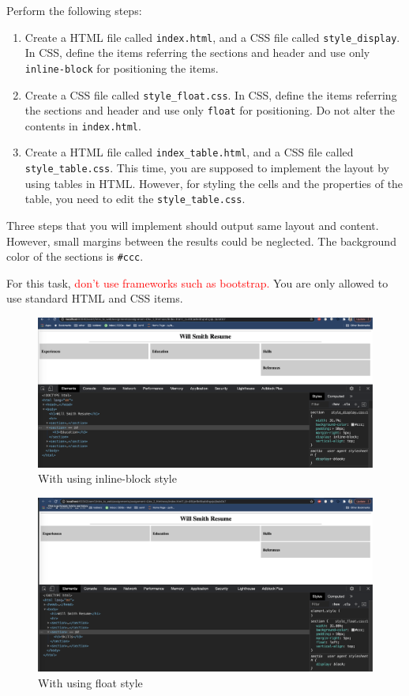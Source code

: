 \documentclass{resources/WeSTassignment}
\begin{document}
Perform the following steps:
\begin{enumerate}
    \item Create a HTML file called \texttt{index.html}, and a CSS file called \texttt{style\_display}. In CSS, define the items referring the sections and header and use only \texttt{inline-block} for positioning the items.
    \item Create a CSS file called \texttt{style\_float.css}. In CSS, define the items referring the sections and header and use only \texttt{float} for positioning. Do not alter the contents in \texttt{index.html}.
    \item Create a HTML file called \texttt{index\_table.html}, and a CSS file called \texttt{style\_table.css}. This time, you are supposed to implement the layout by using tables in HTML. However, for styling the cells and the properties of the table, you need to edit the \texttt{style\_table.css}.
\end{enumerate}

Three steps that you will implement should output same layout and content. However, small margins between the results could be neglected. The background color of the sections is \texttt{\#ccc}.

For this task, \textcolor{red}{don't use frameworks such as bootstrap.} You are only allowed to use standard HTML and CSS items. 

\begin{figure}[h]
   	\centering
   	\includegraphics[scale=1.0,width=\linewidth]{html_css/inline-block.png}
   	\caption{With using inline-block style}
   	\label{fig: With using inline-block style}
\end{figure}

\begin{figure}[h]
   	\centering
   	\includegraphics[scale=1.0,width=\linewidth]{html_css/float.png}
   	\caption{With using float style}
   	\label{fig: With using float style}
\end{figure}
\end{document}
